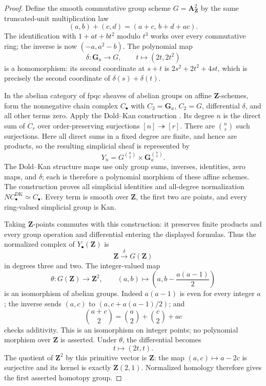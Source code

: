 \begin{proof}
Define the smooth commutative group scheme \(G=\mathbf A_{\mathbf Z}^2\)
by the same truncated-unit multiplication law
\[
 (a,b)+(c,d)=(a+c,\,b+d+ac).
\]
The identification with \(1+at+bt^2\) modulo \(t^3\) works over every
commutative ring; the inverse is now \((-a,a^2-b)\).
The polynomial map
\[
 \delta:\mathbf G_a\longrightarrow G,
 \qquad t\longmapsto(2t,2t^2)
\]
is a homomorphism: its second coordinate at \(s+t\) is
\(2s^2+2t^2+4st\), which is precisely the second coordinate of
\(\delta(s)+\delta(t)\).

In the abelian category of fpqc sheaves of abelian groups on affine
\(\mathbf Z\)-schemes, form the nonnegative chain complex \(C_\bullet\)
with \(C_3=\mathbf G_a\), \(C_2=G\), differential \(\delta\), and all
other terms zero.  Apply the Dold--Kan construction
\cite[Theorem~14.24.3, Tag~019G]{A567_StacksSimplicial}.
Its degree \(n\) is the direct sum of \(C_r\) over order-preserving
surjections \([n]\twoheadrightarrow[r]\).  There are \(\binom nr\)
such surjections.  Here all direct sums in a fixed degree are finite,
and hence are products, so the resulting simplicial sheaf is represented
by
\[
 Y_n=G^{\binom n2}\times\mathbf G_a^{\binom n3}.
\]
The Dold--Kan structure maps use only group sums, inverses, identities,
zero maps, and \(\delta\); each is therefore a polynomial morphism of
these affine schemes.  The construction proves all simplicial identities
and all-degree normalization \(NC_\bullet^{\mathrm{DK}}\simeq C_\bullet\).
Every term is smooth over \(\mathbf Z\), the first two are points, and
every ring-valued simplicial group is Kan.

Taking \(\mathbf Z\)-points commutes with this construction: it
preserves finite products and every group operation and differential
entering the displayed formulas.  Thus the normalized complex of
\(Y_\bullet(\mathbf Z)\) is
\[
 \mathbf Z\xrightarrow{\delta}G(\mathbf Z)
\]
in degrees three and two.  The integer-valued map
\[
 \theta:G(\mathbf Z)\longrightarrow\mathbf Z^2,
 \qquad (a,b)\longmapsto\left(a,b-\frac{a(a-1)}2\right)
\]
is an isomorphism of abelian groups.  Indeed \(a(a-1)\) is even for
every integer \(a\); the inverse sends
\((a,c)\) to \((a,c+a(a-1)/2)\); and
\[
 \binom{a+c}{2}=\binom a2+\binom c2+ac
\]
checks additivity.  This is an isomorphism on integer points; no
polynomial morphism over \(\mathbf Z\) is asserted.
Under \(\theta\), the differential becomes
\[
 t\longmapsto(2t,t).
\]
The quotient of \(\mathbf Z^2\) by this primitive vector is
\(\mathbf Z\): the map \((a,c)\mapsto a-2c\) is surjective and its
kernel is exactly \(\mathbf Z(2,1)\).  Normalized homology therefore
gives the first asserted homotopy group.


\end{proof}

